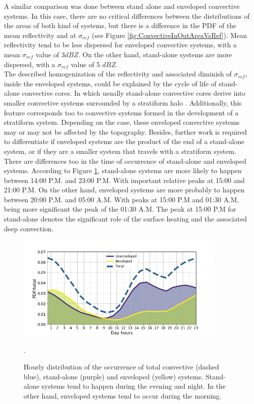 \documentclass[preprint,12pt]{elsarticle}
\begin{document}
A similar comparison was done between stand alone and enveloped convective systems. In this case, there are no critical differences between the distributions of the areas of both kind of systems, but there is a difference in the PDF of the mean reflectivity and at $\sigma_{ref}$ (see Figure \ref{fig:ConvectiveInOutAreaVsRef}). Mean reflectivity tend to be less dispersed for enveloped convective systems, with a mean $\sigma_{ref}$ value of 3$dBZ$.  On the other hand, stand-alone systems are more dispersed, with a $\sigma_{ref}$ value of 5 $dBZ$. \\

The described homogenization of the reflectivity and associated diminish of $\sigma_{ref}$, inside the enveloped systems, could be explained by the cycle of life of stand-alone convective cores.  In which usually stand-alone convective cores derive into smaller convective systems surrounded by a stratiform halo \citep{Rasmussen2014}.  Additionally, this feature corresponds too to convective systems formed in the development of a stratiform system. Depending on the case, these enveloped convective systems may or may not be affected by the topography.  Besides, further work is required to differentiate if enveloped systems are the product of the end of a stand-alone system, or if they are a smaller system that travels with a stratiform system.\\


There are differences too in the time of occurrence of stand-alone and enveloped systems. According to Figure \ref{fig:ConvectiveInOut_hour}, stand-alone systems are more likely to happen between 14:00 P.M. and 23:00 P.M.  With important relative peaks at 15:00 and 21:00 P.M.  On the other hand, enveloped systems are more probably to happen between 20:00 P.M. and 05:00 A.M. With peaks at 15:00 P.M and 01:30 A.M, being more significant the peak of the 01:30 A.M. The peak at 15:00 P.M for stand-alone denotes the significant role of the surface heating and the associated deep convection. \\  

\begin{figure}[!h]
\centering
    \includegraphics[width=10.3cm]{Figuras/Hitogram_Convective_vs_hour.png}
    \caption{Hourly distribution of the occurrence of total convective (dashed blue), stand-alone (purple) and enveloped (yellow) systems. Stand-alone systems tend to happen during the evening and night.  In the other hand, enveloped systems tend to occur during the morning.}.
    \label{fig:ConvectiveInOut_hour}
\end{figure}
\end{document}
